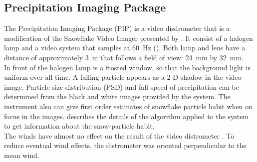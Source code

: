 \newpage
\subsection{Precipitation Imaging Package}

The Precipitation Imaging Package (PIP) is a video disdrometer that is a modification of the Snowflake Video Imager presented by \citet{newman_presenting_2009}. It consist of a halogen lamp and a video system that samples at \SI{60}{\Hz} (). 
Both lamp and lens have a distance of approximately \SI{3}{\metre} that follows a field of view: \SI{24}{\mm} by  \SI{32}{\mm}. 
\\
In front of the halogen lamp is a frosted window, so that the background light is uniform over all time. A falling particle appears as a 2-D shadow in the video image. 
Particle size distribution (PSD) and fall speed of precipitation can be determined from the black and white images provided by the system. The instrument also can give first order estimates of snowflake particle habit when on focus in the images.  
\citet{newman_presenting_2009} describes the details of the algorithm applied to the system to get information about the snow-particle habit. \\
The winds have almost no effect on the result of the video distrometer \citep{newman_presenting_2009}. To reduce eventual wind effects, the distrometer was oriented perpendicular to the mean wind.
\par\medskip\noindent

